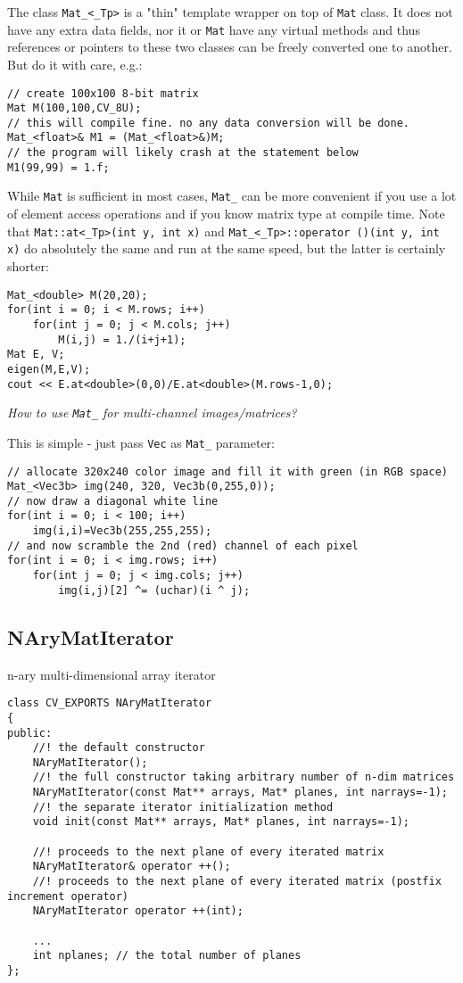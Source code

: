 The class \texttt{Mat\_<\_Tp>} is a "thin" template wrapper on top of \texttt{Mat} class. It does not have any extra data fields, nor it or \texttt{Mat} have any virtual methods and thus references or pointers to these two classes can be freely converted one to another. But do it with care, e.g.:

\begin{lstlisting}
// create 100x100 8-bit matrix
Mat M(100,100,CV_8U);
// this will compile fine. no any data conversion will be done.
Mat_<float>& M1 = (Mat_<float>&)M;
// the program will likely crash at the statement below
M1(99,99) = 1.f;
\end{lstlisting}

While \texttt{Mat} is sufficient in most cases, \texttt{Mat\_} can be more convenient if you use a lot of element access operations and if you know matrix type at compile time. Note that \texttt{Mat::at<\_Tp>(int y, int x)} and \texttt{Mat\_<\_Tp>::operator ()(int y, int x)} do absolutely the same and run at the same speed, but the latter is certainly shorter:

\begin{lstlisting}
Mat_<double> M(20,20);
for(int i = 0; i < M.rows; i++)
    for(int j = 0; j < M.cols; j++)
        M(i,j) = 1./(i+j+1);
Mat E, V;
eigen(M,E,V);
cout << E.at<double>(0,0)/E.at<double>(M.rows-1,0);
\end{lstlisting}

\emph{How to use \texttt{Mat\_} for multi-channel images/matrices?}

This is simple - just pass \texttt{Vec} as \texttt{Mat\_} parameter:
\begin{lstlisting}
// allocate 320x240 color image and fill it with green (in RGB space)
Mat_<Vec3b> img(240, 320, Vec3b(0,255,0));
// now draw a diagonal white line
for(int i = 0; i < 100; i++)
    img(i,i)=Vec3b(255,255,255);
// and now scramble the 2nd (red) channel of each pixel
for(int i = 0; i < img.rows; i++)
    for(int j = 0; j < img.cols; j++)
        img(i,j)[2] ^= (uchar)(i ^ j);
\end{lstlisting}


\subsection{NAryMatIterator}\label{NAryMatIterator}
n-ary multi-dimensional array iterator 

\begin{lstlisting}
class CV_EXPORTS NAryMatIterator
{
public:
    //! the default constructor
    NAryMatIterator();
    //! the full constructor taking arbitrary number of n-dim matrices
    NAryMatIterator(const Mat** arrays, Mat* planes, int narrays=-1);
    //! the separate iterator initialization method
    void init(const Mat** arrays, Mat* planes, int narrays=-1);

    //! proceeds to the next plane of every iterated matrix 
    NAryMatIterator& operator ++();
    //! proceeds to the next plane of every iterated matrix (postfix increment operator)
    NAryMatIterator operator ++(int);

    ...
    int nplanes; // the total number of planes
};
\end{lstlisting}

